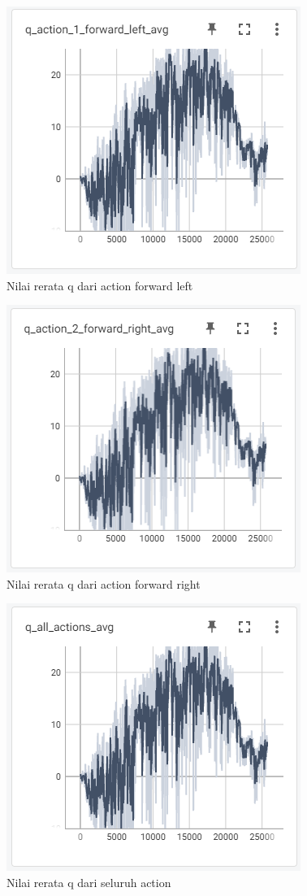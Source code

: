 \documentclass[conference]{IEEEtran}
\begin{document}
	\begin{figure}[H] 
		\centering
		\includegraphics[width=.7\linewidth]{images/q_action_1_forward_left_avg}
		\caption{Nilai rerata q dari action forward left}
		\label{fig:q_action_1_forward_left_avg}
	\end{figure}
	\begin{figure}[H] 
		\centering
		\includegraphics[width=.7\linewidth]{images/q_action_2_forward_right_avg}
		\caption{Nilai rerata q dari action forward right}
		\label{fig:q_action_2_forward_right_avg}
	\end{figure}
	\begin{figure}[H] 
		\centering
		\includegraphics[width=.7\linewidth]{images/q_all_actions_avg}
		\caption{Nilai rerata q dari seluruh action}
		\label{fig:q_all_actions_avg}
	\end{figure}
	
\end{document}

